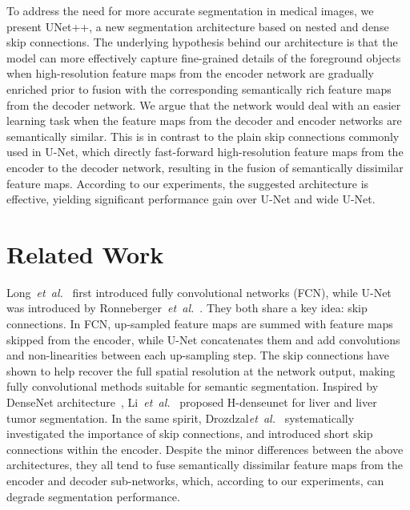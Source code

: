\documentclass[runningheads]{llncs}
\newcommand{\etal}{\mbox{\emph{et al.}}}
\begin{document}
To address the need for more accurate segmentation in medical images, we present UNet++, a new segmentation architecture based on nested and dense skip connections.
The underlying hypothesis behind our architecture is that the model can more effectively capture fine-grained details of the foreground objects when high-resolution feature maps from the encoder network are gradually enriched prior to fusion with the corresponding semantically rich feature maps from the decoder network. We argue that the network would deal with an easier learning task when the feature maps from the decoder and encoder networks are semantically similar. This is in contrast to the plain skip connections commonly used in U-Net, which directly fast-forward high-resolution feature maps from the encoder to the decoder network, resulting in the fusion of semantically dissimilar feature maps. According to our experiments, the suggested architecture is effective, yielding significant performance gain over U-Net and wide U-Net.







\section{Related Work}
\label{sec:related_works}

\iffalse
Because of the widespread interest as evidenced by an IEEE TMI special issue~\cite{greenspan2016guest} and two recent books~\cite{ZhouGreenspanShen2016,lu2017deep}, the literature in deep learning for medical image analysis~\cite{badrinarayanan2017segnet,deeplabv3plus2018,jegou2017one,zhou2017fine} is expanding very rapidly; therefore, due to space, we focus on the most relevant works only.
\fi

Long~\etal~\cite{long2015fully} first introduced fully convolutional networks (FCN), while U-Net was introduced by Ronneberger~\etal~\cite{ronneberger2015u}. They both share a key idea: skip connections.  In FCN, up-sampled feature maps are summed with feature maps skipped from the encoder, while U-Net concatenates them and add convolutions and non-linearities between each up-sampling step. The skip connections have shown to help recover the full spatial resolution at the network output, making fully convolutional methods suitable for semantic segmentation. Inspired by DenseNet architecture~\cite{huang2017densely}, Li~\etal~\cite{li2017h} proposed H-denseunet for liver and liver tumor segmentation. In the same spirit, Drozdzal\etal~\cite{drozdzal2016importance} systematically investigated the importance of skip connections, and introduced short skip connections within the encoder. Despite the minor differences between the above architectures, they all tend to fuse semantically dissimilar feature maps from the encoder and decoder sub-networks, which, according to our experiments, can degrade segmentation performance.
\end{document}
